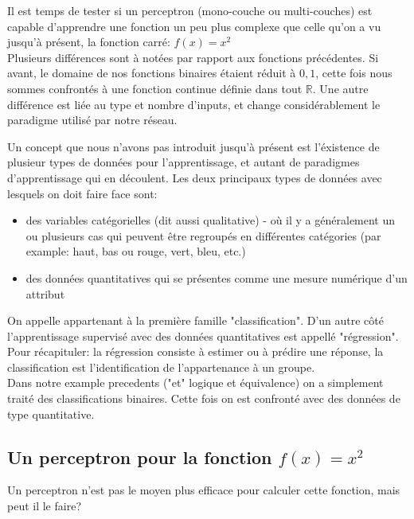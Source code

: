 \documentclass[twoside,openright,a4paper,11pt,french]{article}
\begin{document}
Il est temps de tester si un perceptron (mono-couche ou multi-couches) est
capable d'apprendre une fonction un peu plus complexe que celle qu'on a vu
jusqu'à présent, la fonction carré: $f(x) = x^2$ \\

Plusieurs différences sont à notées par rapport aux fonctions précédentes.
Si avant, le domaine de nos fonctions binaires étaient réduit à ${0,1}$, cette
fois nous sommes confrontés à une fonction continue définie dans tout $\mathbb{R}$.
Une autre différence est liée au type et nombre d'inputs, et change
considérablement le paradigme utilisé par notre réseau.

Un concept que nous n'avons pas introduit jusqu'à présent est l'éxistence de plusieur
types de données pour l'apprentissage, et autant de paradigmes d'apprentissage qui en
découlent. Les deux principaux types de données avec lesquels on doit faire
face sont:

\begin{itemize}
\item des variables catégorielles (dit aussi qualitative) - où il y a généralement
      un ou plusieurs cas qui peuvent être regroupés en différentes catégories 
     (par example: haut, bas ou rouge, vert, bleu, etc.)
\item des données quantitatives qui se présentes comme une mesure numérique d'un attribut
\end{itemize}

On appelle %
appartenant à la première famille "classification". D'un autre côté l'apprentissage
supervisé avec des données quantitatives est appellé "régression".\cite{kindsNN}\\

Pour récapituler: la régression consiste à estimer ou à prédire une réponse,
la classification est l'identification de l'appartenance à un groupe.\\

Dans notre example precedents ("et" logique et équivalence) on a simplement
traité des classifications binaires. Cette fois on est confronté avec des données
de type quantitative.


\subsection{Un perceptron pour la fonction $f(x) = x^2$}
Un perceptron n'est pas le moyen plus efficace pour calculer cette 
fonction, mais peut il le faire?\\
\end{document}
